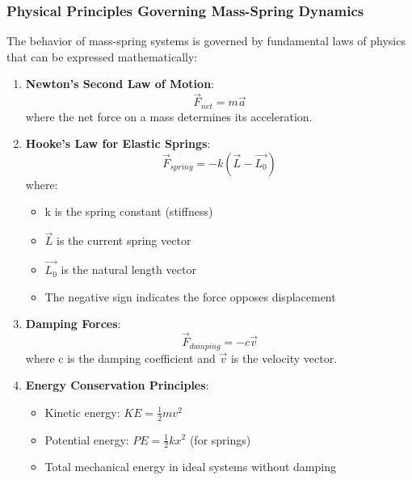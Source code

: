 \subsubsection{Physical Principles Governing Mass-Spring Dynamics}

The behavior of mass-spring systems is governed by fundamental laws of physics that can be expressed mathematically:

\begin{enumerate}
    \item \textbf{Newton's Second Law of Motion}:
    \begin{equation}
        \vec{F}_{net} = m\vec{a}
    \end{equation}
    where the net force on a mass determines its acceleration.
    
    \item \textbf{Hooke's Law for Elastic Springs}:
    \begin{equation}
        \vec{F}_{spring} = -k(\vec{L} - \vec{L_0})
    \end{equation}
    where:
    \begin{itemize}
        \item k is the spring constant (stiffness)
        \item $\vec{L}$ is the current spring vector
        \item $\vec{L_0}$ is the natural length vector
        \item The negative sign indicates the force opposes displacement
    \end{itemize}
    
    \item \textbf{Damping Forces}:
    \begin{equation}
        \vec{F}_{damping} = -c\vec{v}
    \end{equation}
    where c is the damping coefficient and $\vec{v}$ is the velocity vector.
    
    \item \textbf{Energy Conservation Principles}:
    \begin{itemize}
        \item Kinetic energy: $KE = \frac{1}{2}mv^2$
        \item Potential energy: $PE = \frac{1}{2}kx^2$ (for springs)
        \item Total mechanical energy in ideal systems without damping
    \end{itemize}
\end{enumerate}

